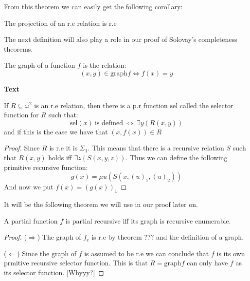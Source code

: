 \documentclass[../main.tex]{subfiles}
\begin{document}
From this theorem we can easily get the following corollary:
\begin{cor}
	The projection of an r.e relation is r.e
\end{cor}

The next definition will also play a role in our proof of Solovay's
completeness theorems.

\begin{defi}
	The graph of a function $f$ is the relation:
	$$(x,y)\in\text{graph} f\Leftrightarrow f(x)=y$$
\end{defi}
\textbf{Text}
\begin{thm}
	If $R\subseteq\omega^2$ is an r.e relation, then there is a p.r
	function $\text{sel}$ called the selector function for $R$ such that:
	$$\text{sel}(x)\ \text{is defined}\ \Leftrightarrow\ \exists y(R(x,y))$$
	and if this is the case we have that $(x,f(x))\in R$
\end{thm}
\begin{proof}
	Since $R$ is r.e it is $\Sigma_1$. This means that there is a recursive
	relation $S$ such that $R(x,y)$ holds iff $\exists z (S(x,y,z))$. Thus
	we can define the following primitive recursive function:
	$$g(x)=\mu u(S(x,(u)_1,(u)_2))$$
	And now we put $f(x)=(g(x))_1$
\end{proof}
It will be the following theorem we will use in our proof later on.
\begin{thm}
	A partial function $f$ is partial recursive iff its graph is recursive
	enumerable.
\end{thm}
\begin{proof}
	($\Rightarrow$) The graph of $f_e$ is r.e by theorem ??? and the
	definition of a graph.

	($\Leftarrow$) Since the graph of $f$ is assumed to be r.e we can
	conclude that $f$ is its own prmitive recursive selector function. This
	is that $R=\text{graph} f$ can only have $f$ as its selector function.
	[Whyyy?]
\end{proof}
\end{document}
